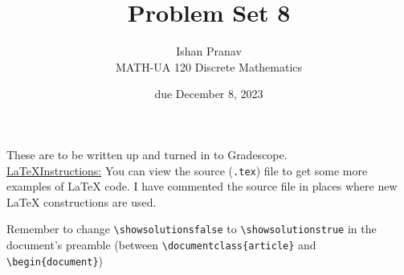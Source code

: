 \documentclass{article}
\title{Problem Set 8}
\author{%
    Ishan Pranav
\\  MATH-UA 120 Discrete Mathematics
}
\date{due December 8, 2023}
\newif\ifshowsolutions
\newcommand{\danger}{\marginpar[\hfill\dbend]{\dbend\hfill}}
\theoremstyle{definition}
\begin{document}
\maketitle
These are to be written up and turned in to Gradescope.\\

\ifshowsolutions
    \SetupExSheets{solution/print=true}
\else
    \danger
 \underline{ \LaTeX  Instructions:}  You can view the source (\texttt{.tex}) file to get some more examples of \LaTeX{} code.  I have commented the source file in places where new \LaTeX{} constructions are used.
  
  Remember to change \verb|\showsolutionsfalse| to \verb|\showsolutionstrue|
    in the document's preamble 
    (between \verb|\documentclass{article}| and \verb|\begin{document}|)
\fi
\end{document}
